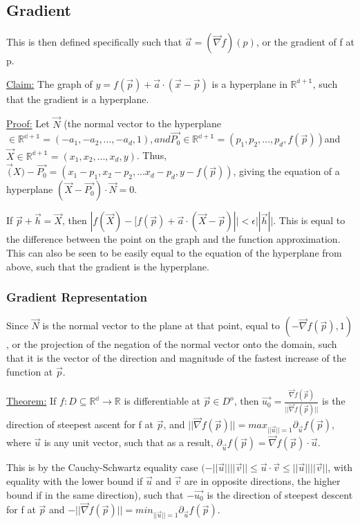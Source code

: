 \documentclass[11 pt, twoside]{article}
\begin{document}
\subsection{Gradient}

This is then defined specifically such that $\vec{a} = (\vec{\nabla}f)(p)$, or the gradient of f at p.

\underline{Claim:}
The graph of $y = f(\vec{p}) + \vec{a} \cdot (\vec{x} - \vec{p})$ is a hyperplane in $\mathbb{R^{d+1}}$, such that the gradient is a hyperplane.

\underline{Proof:}
Let $\vec{N}$ (the normal vector to the hyperplane$ \in \mathbb{R^{d+1}} = (-a_1, -a_2, ..., -a_d, 1), and \vec{P_0} \in \mathbb{R^{d+1}} = (p_1, p_2, ..., p_d, f(\vec{p}))$and $\vec{X} \in \mathbb{R^{d+1}} = (x_1, x_2, ..., x_d, y)$. Thus, $\vec(X) - \vec{P_0} = (x_1 - p_1, x_2 - p_2, ... x_d - p_d, y - f(\vec{p}))$, giving the equation of a hyperplane $(\vec{X} - \vec{P_0}) \cdot \vec{N} = 0$.

If $\vec{p} + \vec{h} = \vec{X}$, then $|f(\vec{X}) - [f(\vec{p}) + \vec{a} \cdot (\vec{X} - \vec{p})|| < \epsilon||\vec{h}||$. This is equal to the difference between the point on the graph and the function approximation. This can also be seen to be easily equal to the equation of the hyperplane from above, such that the gradient is the hyperplane.

\subsubsection{Gradient Representation}

Since $\vec{N}$ is the normal vector to the plane at that point, equal to $(-\vec{\nabla}f(\vec{p}), 1)$, or the projection of the negation of the normal vector onto the domain, such that it is the vector of the direction and magnitude of the fastest increase of the function at $\vec{p}$.

\underline{Theorem:}
If $f:D \subseteq \mathbb{R^d} \to \mathbb{R}$ is differentiable at $\vec{p} \in D^o$, then $\vec{u_0} = \frac{\vec{\nabla}f(\vec{p})}{||\vec{\nabla}f(\vec{p})||}$ is the direction of steepest ascent for f at $\vec{p}$, and $||\vec{\nabla}f(\vec{p})|| = max_{||\vec{u}||=1} \partial_\vec{u} f(\vec{p})$, where $\vec{u}$ is any unit vector, such that as a result, $\partial_{\vec{u}} f(\vec{p}) = \vec{\nabla}f(\vec{p}) \cdot \vec{u}$.

This is by the Cauchy-Schwartz equality case $(-||\vec{u}||||\vec{v}|| \leq \vec{u} \cdot \vec{v} \leq ||\vec{u}||||\vec{v}||$, with equality with the lower bound if $\vec{u}$ and $\vec{v}$ are in opposite directions, the higher bound if in the same direction), such that $-\vec{u_0}$ is the direction of steepest descent for f at $\vec{p}$ and $-||\vec{\nabla}f(\vec{p})|| = min_{||\vec{u}||=1} \partial_{\vec{u}}f(\vec{p}).$ 
\end{document}
